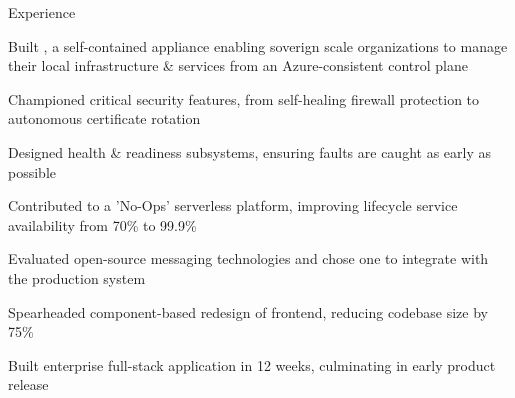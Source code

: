 \documentclass{resume} %
\begin{document}

    \begin{rSection}{Experience}

        \company{\microsoft}{\seattle}
                \begin{rList}
		    \item Built {\aldo}, a self-contained appliance enabling soverign scale organizations to
			manage their local infrastructure \& services from an Azure-consistent
			control plane
		    \item Championed critical security features, from self-healing firewall protection
			to autonomous certificate rotation
		    \item Designed health \& readiness subsystems, ensuring faults
			are caught as early as possible
                \end{rList}
                \begin{rList}
		    \item Contributed to a 'No-Ops' serverless platform, improving lifecycle
			service availability from 70\% to 99.9\%
                \end{rList}
                \begin{rList}
                    \item Evaluated open-source messaging technologies
                        and chose one to integrate with the production system
                \end{rList}
        \vspace{0.5em}


        \company{\lefttravel}{\la}
                \begin{rList}
                    \item Spearheaded component-based redesign of frontend,
                        reducing codebase size by 75\%
                    \item Built enterprise full-stack application in 12 weeks, culminating in early
                        product release
                \end{rList}
        \vspace{0.5em}

    \end{rSection}
\end{document}
